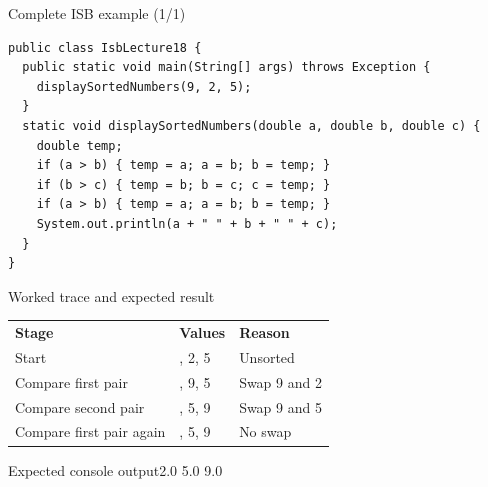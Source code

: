 \documentclass[10pt,aspectratio=169]{beamer}
\begin{document}
\begin{frame}[fragile,t]{Complete ISB example (1/1)}
\begin{lstlisting}
public class IsbLecture18 {
  public static void main(String[] args) throws Exception {
    displaySortedNumbers(9, 2, 5);
  }
  static void displaySortedNumbers(double a, double b, double c) {
    double temp;
    if (a > b) { temp = a; a = b; b = temp; }
    if (b > c) { temp = b; b = c; c = temp; }
    if (a > b) { temp = a; a = b; b = temp; }
    System.out.println(a + " " + b + " " + c);
  }
}
\end{lstlisting}
\end{frame}

\begin{frame}[fragile,t]{Worked trace and expected result}
\small\renewcommand{\arraystretch}{1.4}
\begin{tabularx}{\textwidth}{>{\raggedright\arraybackslash}X>{\raggedright\arraybackslash}X>{\raggedright\arraybackslash}X}\rowcolor{navy}
\color{white}\bfseries Stage & \color{white}\bfseries Values & \color{white}\bfseries Reason\\
Start & 9, 2, 5 & Unsorted\\
Compare first pair & 2, 9, 5 & Swap 9 and 2\\
Compare second pair & 2, 5, 9 & Swap 9 and 5\\
Compare first pair again & 2, 5, 9 & No swap\\
\end{tabularx}\par\vspace{2mm}
\begin{block}{Expected console output}\ttfamily\footnotesize 2.0 5.0 9.0\end{block}
\end{frame}
\end{document}
